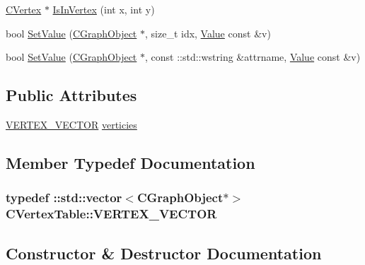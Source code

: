 \begin{DoxyCompactItemize}
\item 
\hyperlink{class_c_vertex}{C\+Vertex} $\ast$ \hyperlink{class_c_vertex_table_aab829e22fe07871940da87f676a62236}{Is\+In\+Vertex} (int x, int y)
\item 
bool \hyperlink{class_c_vertex_table_aeb0aa1231fb6a40b79dac9c43e9c1c2f}{Set\+Value} (\hyperlink{class_c_graph_object}{C\+Graph\+Object} $\ast$, size\+\_\+t idx, \hyperlink{class_value}{Value} const \&v)
\item 
bool \hyperlink{class_c_vertex_table_aeaea5ff94d8535e89f60e51eeabfc9ae}{Set\+Value} (\hyperlink{class_c_graph_object}{C\+Graph\+Object} $\ast$, const \+::std\+::wstring \&attrname, \hyperlink{class_value}{Value} const \&v)
\end{DoxyCompactItemize}
\subsection*{Public Attributes}
\begin{DoxyCompactItemize}
\item 
\hyperlink{class_c_vertex_table_a0d1b76467f2add225225fddebafc68f9}{V\+E\+R\+T\+E\+X\+\_\+\+V\+E\+C\+T\+O\+R} \hyperlink{class_c_vertex_table_a57e0aed3f5222453d13ca5816477354b}{verticies}
\end{DoxyCompactItemize}


\subsection{Member Typedef Documentation}
\hypertarget{class_c_vertex_table_a0d1b76467f2add225225fddebafc68f9}{}
\subsubsection[{V\+E\+R\+T\+E\+X\+\_\+\+V\+E\+C\+T\+O\+R}]{\setlength{\rightskip}{0pt plus 5cm}typedef \+::std\+::vector$<${\bf C\+Graph\+Object}$\ast$$>$ {\bf C\+Vertex\+Table\+::\+V\+E\+R\+T\+E\+X\+\_\+\+V\+E\+C\+T\+O\+R}}\label{class_c_vertex_table_a0d1b76467f2add225225fddebafc68f9}


\subsection{Constructor \& Destructor Documentation}
\hypertarget{class_c_vertex_table_a561b683b554bde1bab8232f695eccf95}{}
